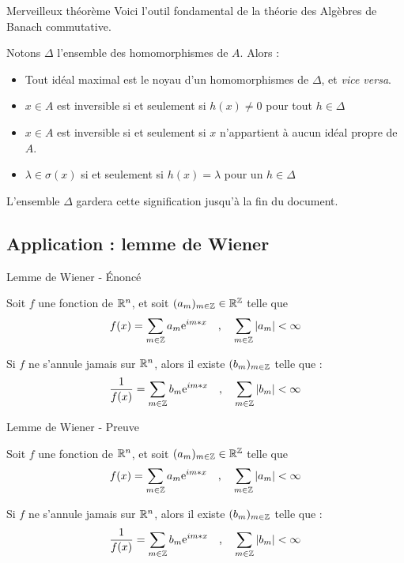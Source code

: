 \documentclass[11pt, xcolor=table]{beamer}
\begin{document}
\begin{frame}{Merveilleux théorème}
    Voici l'outil fondamental de la théorie des Algèbres de Banach commutative.

       \begin{myth}
           Notons $\Delta$ l'ensemble des homomorphismes de $A$. Alors :
           \begin{itemize}[<+->]
               \item Tout idéal maximal est le noyau d'un homomorphismes de $\Delta$, et \emph{vice versa}.
               \item $x \in A$ est inversible si et seulement si $h(x) \not = 0$ pour tout $h \in \Delta$
               \item $x \in A$ est inversible si et seulement si $x$ n'appartient à aucun idéal propre de $A$.
               \item $\lambda \in \sigma(x) $  si et seulement si $h(x) = \lambda $ pour un $h \in \Delta$
           \end{itemize}

           L'ensemble $\Delta$ gardera cette signification jusqu'à la fin du document.
       \end{myth} 
\end{frame}

\subsection{Application : lemme de Wiener }
\begin{frame}{Lemme de Wiener - Énoncé}
    \begin{myth}
        Soit $f$ une fonction de $\mathbb{R}^n$, et soit $(a_m)_{m \in \mathbb{Z}} \in \mathbb{R}^{\mathbb{Z}} $ telle que 
        \[
            f(x) = \sum_{m\in \mathbb{Z} } a_m \textrm{e}^{im*x} \quad \text{,} \quad \sum_{m \in \mathbb{Z} } | a_m | < \infty 
        \]

        Si $f$ ne s'annule jamais sur $\mathbb{R}^n$, alors il existe $(b_m)_{m \in \mathbb{Z}} $ telle que :
        \[
            \frac{1}{f(x)} = \sum_{m \in \mathbb{Z}} b_m \textrm{e}^{im*x} \quad \text{,} \quad \sum_{m \in \mathbb{Z} } | b_m | < \infty 
        \]
    \end{myth}
\end{frame}

\begin{frame}{Lemme de Wiener - Preuve}
    \begin{myth}
        Soit $f$ une fonction de $\mathbb{R}^n$, et soit $(a_m)_{m \in \mathbb{Z}} \in \mathbb{R}^{\mathbb{Z}} $ telle que 
        \[
            f(x) = \sum_{m\in \mathbb{Z} } a_m \textrm{e}^{im*x} \quad \text{,} \quad \sum_{m \in \mathbb{Z} } | a_m | < \infty 
        \]

        Si $f$ ne s'annule jamais sur $\mathbb{R}^n$, alors il existe $(b_m)_{m \in \mathbb{Z}} $ telle que :
        \[
            \frac{1}{f(x)} = \sum_{m \in \mathbb{Z}} b_m \textrm{e}^{im*x} \quad \text{,} \quad \sum_{m \in \mathbb{Z} } | b_m | < \infty 
        \]
    \end{myth}
\end{frame}
\end{document}
